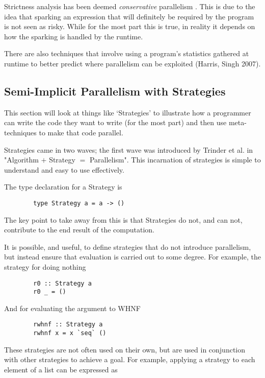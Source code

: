     Strictness analysis has
been deemed \emph{conservative} parallelism \citep{SPJ:PIFPL}. This is due to
the idea that sparking an expression that will definitely be required by the
program is not seen as risky. While for the most part this is true, in reality
it depends on how the sparking is handled by the runtime.

    There are also techniques that involve using a program's statistics gathered
at runtime to better predict where parallelism can be exploited (Harris, Singh
2007).

\subsection{Semi-Implicit Parallelism with Strategies}
    This section will look at things like `Strategies' to illustrate how a
programmer can write the code they want to write (for the most part) and then
use meta-techniques to make that code parallel.

Strategies came in two waves; the first wave was introduced by Trinder et al. in
"Algorithm \(+\) Strategy \(=\) Parallelism". This incarnation of strategies is
simple to understand and easy to use effectively.

The type declaration for a Strategy is

\begin{verbatim}
        type Strategy a = a -> ()
\end{verbatim}

The key point to take away from this is that Strategies do not, and can not,
contribute to the end result of the computation.

It is possible, and useful, to define strategies that do not introduce
parallelism, but instead ensure that evaluation is carried out to some degree.
For example, the strategy for doing nothing

\begin{verbatim}
        r0 :: Strategy a
        r0 _ = ()
\end{verbatim}

And for evaluating the argument to WHNF

\begin{verbatim}
        rwhnf :: Strategy a
        rwhnf x = x `seq` ()
\end{verbatim}

These strategies are not often used on their own, but are used in conjunction
with other strategies to achieve a goal. For example, applying a strategy to
each element of a list can be expressed as

